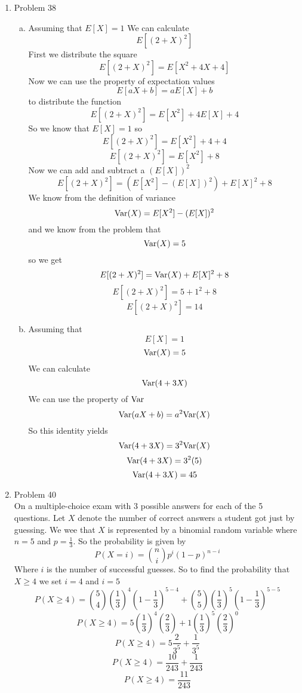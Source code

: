 \documentclass[11pt]{article}
\newcommand{\Var}{\textnormal{Var}}
\begin{document}
\begin{enumerate}
\item Problem 38
\begin{enumerate}[(a)]
\item
Assuming that 
$E[X] = 1$
We can calculate 
$$E[(2+X)^2]$$
First we distribute the square
$$E[(2+X)^2]=E[X^2+4X+4]$$
Now we can use the property of expectation values
$$E[aX+b] = aE[X]+b$$
to distribute the function
$$E[(2+X)^2]=E[X^2]+4E[X]+4$$
So we know that $E[X]=1$ so
$$E[(2+X)^2]=E[X^2]+4+4$$
$$E[(2+X)^2]=E[X^2]+8$$
Now we can add and subtract a $(E[X])^2$
$$E[(2+X)^2]=(E[X^2]-(E[X])^2)+E[X]^2+8$$
We know from the definition of variance 
$$\Var(X) = E[X^2]-(E[X])^2$$
and we know from the problem that 
$$\Var(X) = 5$$
so we get
$$E[(2+X)^2]=\Var(X)+E[X]^2+8$$
$$E[(2+X)^2]=5+1^2+8$$
$$E[(2+X)^2]=14$$
\item
Assuming that
$$E[X] = 1$$
$$\Var(X) = 5$$
We can calculate 
$$\Var(4+3X)$$
We can use the property of $\Var$
$$\Var(aX+b) = a^2\Var(X)$$
So this identity yields
$$\Var(4+3X)=3^2\Var(X)$$
$$\Var(4+3X)=3^2(5)$$
$$\Var(4+3X)=45$$

\end{enumerate}
\item Problem 40\\
On a multiple-choice exam with 3 possible answers for each of the 5 questions. Let $X$ denote the number of correct answers a student got just by guessing. We wee that $X$ is represented by a binomial random variable where $n=5$ and $p=\frac{1}{3}$. 
So the probability is given by
$$P(X=i) = {n\choose i}p^i(1-p)^{n-i}$$
Where $i$ is the number of successful guesses. So to find the probability that $X\ge4$ we set $i=4$ and $i=5$
$$P(X\ge4) = {5\choose 4}\left(\frac{1}{3}\right)^4\left(1-\frac{1}{3}\right)^{5-4}+{5\choose 5}\left(\frac{1}{3}\right)^5\left(1-\frac{1}{3}\right)^{5-5}$$
$$P(X\ge4) = 5\left(\frac{1}{3}\right)^4\left(\frac{2}{3}\right)+1\left(\frac{1}{3}\right)^5\left(\frac{2}{3}\right)^{0}$$
$$P(X\ge4) = 5\frac{2}{3^5}+\frac{1}{3^5}$$
$$P(X\ge4) = \frac{10}{243}+\frac{1}{243}$$
$$P(X\ge4) = \frac{11}{243}$$


\end{enumerate}
\end{document}
